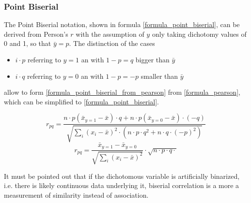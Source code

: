 \documentclass[a4paper,12pt]{report}
\begin{document}
\subsubsection{Point Biserial}
The Point Biserial notation, shown in formula \ref{formula_point_biserial}, can be derived from Person's $r$ with the assumption of $y$ only taking dichotomy values of 0 and 1, so that $\bar{y} = p$. The distinction of the cases

\begin{itemize}
	\item $i \cdot p$ referring to $y=1$ an with $1 - p = q$ bigger than $\bar{y}$
	\item $i \cdot q$ referring to $y=0$ an with $1 - p = -p$ smaller than $\bar{y}$
\end{itemize}
allow to form \ref{formula_point_biserial_from_pearson} from \ref{formula_pearson}, which can be simplified to \ref{formula_point_biserial}. \cite{Tate1954,CohenWest2003,Bortz2004,DeJesus2019}

\smallskip

\begin{equation}
\label{formula_point_biserial_from_pearson}
	r_{pq} =  \frac{n \cdot p (\bar{x}_{y=1}-\bar{x}) \cdot q + n \cdot p (\bar{x}_{y=0}-\bar{x}) \cdot (-q)}{\sqrt{\sum_{i}{(x_i-\bar{x})^2} \cdot (n \cdot p \cdot q^2 + n \cdot q \cdot (-p)^2)}}
\end{equation}
\begin{equation}
\label{formula_point_biserial}
	r_{pq} =  \frac{\bar{x}_{y=1}-\bar{x}_{y=0}}{\sqrt{\sum_{i}{(x_i-\bar{x})^2}}} \cdot \sqrt{n \cdot p \cdot q \cdot} 
\end{equation}

\smallskip

It must be pointed out that if the dichotomous variable is artificially binarized, i.e. there is likely continuous data underlying it, biserial correlation is a more a measurement of similarity instead of association.
\end{document}
